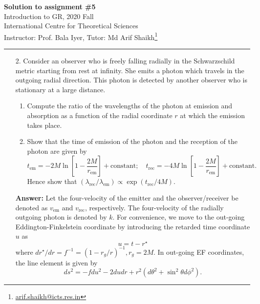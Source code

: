 \documentclass{article}
\begin{document}
\begin{center}
  {\bfseries Solution to assignment \#5}\\
  Introduction to GR, 2020 Fall\\
  International Centre for Theoretical Sciences\\
  Instructor: Prof. Bala Iyer, Tutor: Md Arif Shaikh\footnote{\href{mailto: arif.shaikh@icts.res.in}{arif.shaikh@icts.res.in}}\\
\end{center}
\hrule

\begin{enumerate}
\item[2.] Consider an observer who is freely falling radially in the Schwarzschild metric starting from rest at infinity. She emits a photon which travels in the outgoing radial direction. This photon is detected by another observer who is stationary at a large distance.
  \begin{enumerate}
  \item Compute the ratio of the wavelengths of the photon at emission and absorption as a function of the radial coordinate $r$ at which the emission takes place.
  \item Show that the time of emission of the photon and the reception of the photon are given by
    \begin{equation}
      \label{eq:t_em}
      t_{\text{em}}=-2M\ln\left[1-\frac{2M}{r_{\text{em}}}\right] + \text{constant};\quad t_{\text{rec}}=-4M\ln\left[1-\frac{2M}{r_{\text{em}}}\right] + \text{constant}.
    \end{equation}
    Hence show that $(\lambda_{\text{rec}}/\lambda_{\text{em}}) \propto \exp(t_{\text{rec}}/4M)$.
  \end{enumerate}
  {\bfseries Answer:} Let the four-velocity of the emitter and the observer/receiver be denoted as $v_{\text{em}}$ and $v_{\text{rec}}$, respectively. The four-velocity of the radially outgoing photon is denoted by $k$. For convenience, we move to the out-going Eddington-Finkelstein coordinate by introducing the retarded time coordinate $u$ as
  \begin{equation}
    \label{eq:eddington-finkelstein}
    u = t - r^\star
  \end{equation}
  where $dr^\star/dr = f^{-1} = (1-r_g/r)^{-1}, r_g=2M$. In out-going EF coordinates, the line element is given by
\begin{equation}
  \label{eq:line-element-EF}
  ds^2 = -fdu^2 -2dudr + r^2 (d\theta^2 + \sin^2\theta d\phi^2).
\end{equation}


\end{enumerate}
\end{document}
